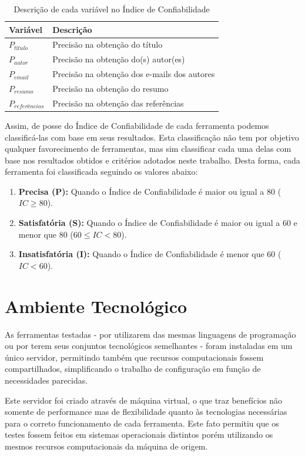 \begin{table}[h!]
    \caption{Descrição de cada variável no Índice de Confiabilidade}
    \begin{center}
        \begin{tabular}{|p{3cm}|p{8cm}|}
            \hline \textbf{Variável} & \textbf{Descrição}\\ 
            \hline $P_{título}$ & Precisão na obtenção do título \\
            \hline $P_{autor}$ & Precisão na obtenção do(s) autor(es)\\
            \hline $P_{email}$ & Precisão na obtenção dos e-mails dos autores \\
            \hline $P_{resumo}$ & Precisão na obtenção do resumo \\
            \hline $P_{referências}$ & Precisão na obtenção das referências \\
            \hline 
        \end{tabular} 
    \end{center}
    \label{tab:confiability-index}
\end{table}

Assim, de posse do Índice de Confiabilidade de cada ferramenta podemos classificá-las com base em seus resultados. Esta classificação não tem por objetivo qualquer favorecimento de ferramentas, mas sim classificar cada uma delas com base nos resultados obtidos e critérios adotados neste trabalho. Desta forma, cada ferramenta foi classificada seguindo os valores abaixo:

\begin{enumerate}
    \item \textbf{Precisa (P):} Quando o Índice de Confiabilidade é maior ou igual a 80 ($IC\geq80$).
    \item \textbf{Satisfatória (S):} Quando o Índice de Confiabilidade é maior ou igual a 60 e menor que 80 ($60 \leq IC < 80$).
    \item \textbf{Insatisfatória (I):} Quando o Índice de Confiabilidade é menor que 60 ($IC < 60$).
\end{enumerate}

\section{Ambiente Tecnológico}
\label{sec:tech-environment}

As ferramentas testadas - por utilizarem das mesmas linguagens de programação ou por terem seus conjuntos tecnológicos semelhantes - foram instaladas em um único servidor, permitindo também que recursos computacionais fossem compartilhados, simplificando o trabalho de configuração em função de necessidades parecidas.

Este servidor foi criado através de máquina virtual, o que traz benefícios não somente de performance mas de flexibilidade quanto às tecnologias necessárias para o correto funcionamento de cada ferramenta. Este fato permitiu que os testes fossem feitos em sistemas operacionais distintos porém utilizando os mesmos recursos computacionais da máquina de origem.


